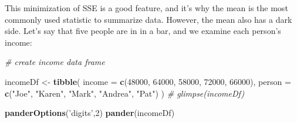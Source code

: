 \documentclass[]{book}
\newenvironment{Shaded}{\begin{snugshade}}{\end{snugshade}}
\newcommand{\KeywordTok}[1]{\textcolor[rgb]{0.13,0.29,0.53}{\textbf{#1}}}
\newcommand{\DataTypeTok}[1]{\textcolor[rgb]{0.13,0.29,0.53}{#1}}
\newcommand{\DecValTok}[1]{\textcolor[rgb]{0.00,0.00,0.81}{#1}}
\newcommand{\StringTok}[1]{\textcolor[rgb]{0.31,0.60,0.02}{#1}}
\newcommand{\CommentTok}[1]{\textcolor[rgb]{0.56,0.35,0.01}{\textit{#1}}}
\newcommand{\NormalTok}[1]{#1}
\theoremstyle{definition}
\theoremstyle{definition}
\theoremstyle{definition}
\theoremstyle{remark}
\begin{document}
This minimization of SSE is a good feature, and it's why the mean is the
most commonly used statistic to summarize data. However, the mean also
has a dark side. Let's say that five people are in in a bar, and we
examine each person's income:

\begin{Shaded}
\begin{Highlighting}[]
\CommentTok{# create income data frame}

\NormalTok{incomeDf <-}\StringTok{ }
\StringTok{  }\KeywordTok{tibble}\NormalTok{(}
  \DataTypeTok{income =} \KeywordTok{c}\NormalTok{(}\DecValTok{48000}\NormalTok{, }\DecValTok{64000}\NormalTok{, }\DecValTok{58000}\NormalTok{, }\DecValTok{72000}\NormalTok{, }\DecValTok{66000}\NormalTok{),}
  \DataTypeTok{person =} \KeywordTok{c}\NormalTok{(}\StringTok{"Joe"}\NormalTok{, }\StringTok{"Karen"}\NormalTok{, }\StringTok{"Mark"}\NormalTok{, }\StringTok{"Andrea"}\NormalTok{, }\StringTok{"Pat"}\NormalTok{)}
\NormalTok{)}
\CommentTok{# glimpse(incomeDf)}

\KeywordTok{panderOptions}\NormalTok{(}\StringTok{'digits'}\NormalTok{,}\DecValTok{2}\NormalTok{)}
\KeywordTok{pander}\NormalTok{(incomeDf)}
\end{Highlighting}
\end{Shaded}
\end{document}
